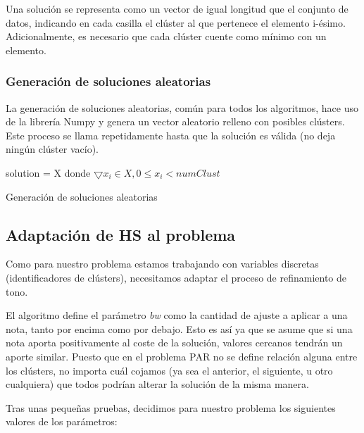 Una solución se representa como un vector de igual longitud que el conjunto de datos, indicando en cada casilla el clúster al que pertenece el elemento i-ésimo. Adicionalmente, es necesario que cada clúster cuente como mínimo con un elemento.


\subsubsection{Generación de soluciones aleatorias}

La generación de soluciones aleatorias, común para todos los algoritmos, hace uso de la librería Numpy y genera un vector aleatorio relleno con posibles clústers. Este proceso se llama repetidamente hasta que la solución es válida (no deja ningún clúster vacío).

\vspace{\baselineskip}

\begin{algorithm}[H]
    \SetAlgoLined
         {
            solution = X donde $\bigtriangledown x_i \in X, 0 \leq x_i < numClust $ \;
        }
    \caption{Generación de soluciones aleatorias}
\end{algorithm}


\subsection{Adaptación de HS al problema}

Como para nuestro problema estamos trabajando con variables discretas (identificadores de clústers), necesitamos adaptar el proceso de refinamiento de tono. 

El algoritmo define el parámetro \textit{bw} como la cantidad de ajuste a aplicar a una nota, tanto por encima como por debajo. Esto es así ya que se asume que si una nota aporta positivamente al coste de la solución, valores cercanos tendrán un aporte similar. Puesto que en el problema PAR no se define relación alguna entre los clústers, no importa cuál cojamos (ya sea el anterior, el siguiente, u otro cualquiera) que todos podrían alterar la solución de la misma manera.

\vspace{\baselineskip}

Tras unas pequeñas pruebas, decidimos para nuestro problema los siguientes valores de los parámetros:

